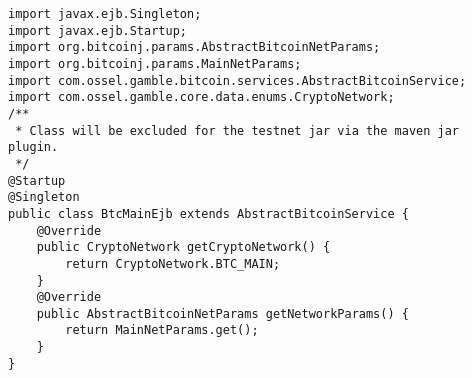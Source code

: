 \begin{lstlisting}
import javax.ejb.Singleton;
import javax.ejb.Startup;
import org.bitcoinj.params.AbstractBitcoinNetParams;
import org.bitcoinj.params.MainNetParams;
import com.ossel.gamble.bitcoin.services.AbstractBitcoinService;
import com.ossel.gamble.core.data.enums.CryptoNetwork;
/**
 * Class will be excluded for the testnet jar via the maven jar plugin.
 */
@Startup
@Singleton
public class BtcMainEjb extends AbstractBitcoinService {
    @Override
    public CryptoNetwork getCryptoNetwork() {
        return CryptoNetwork.BTC_MAIN;
    }
    @Override
    public AbstractBitcoinNetParams getNetworkParams() {
        return MainNetParams.get();
    }
}
\end{lstlisting}

